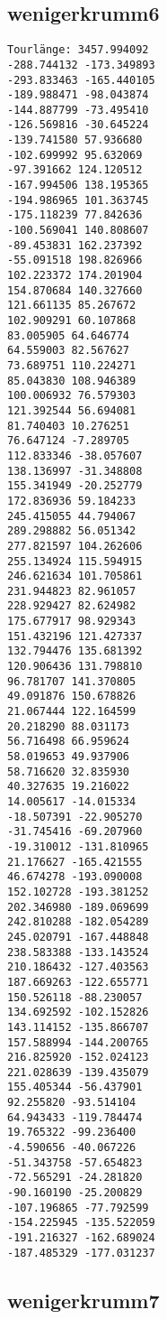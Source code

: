 \documentclass[a4paper, 10pt, ngerman]{article}
\begin{document}
\subsection*{wenigerkrumm6}

\begin{verbatim}
Tourlänge: 3457.994092
-288.744132 -173.349893
-293.833463 -165.440105
-189.988471 -98.043874
-144.887799 -73.495410
-126.569816 -30.645224
-139.741580 57.936680
-102.699992 95.632069
-97.391662 124.120512
-167.994506 138.195365
-194.986965 101.363745
-175.118239 77.842636
-100.569041 140.808607
-89.453831 162.237392
-55.091518 198.826966
102.223372 174.201904
154.870684 140.327660
121.661135 85.267672
102.909291 60.107868
83.005905 64.646774
64.559003 82.567627
73.689751 110.224271
85.043830 108.946389
100.006932 76.579303
121.392544 56.694081
81.740403 10.276251
76.647124 -7.289705
112.833346 -38.057607
138.136997 -31.348808
155.341949 -20.252779
172.836936 59.184233
245.415055 44.794067
289.298882 56.051342
277.821597 104.262606
255.134924 115.594915
246.621634 101.705861
231.944823 82.961057
228.929427 82.624982
175.677917 98.929343
151.432196 121.427337
132.794476 135.681392
120.906436 131.798810
96.781707 141.370805
49.091876 150.678826
21.067444 122.164599
20.218290 88.031173
56.716498 66.959624
58.019653 49.937906
58.716620 32.835930
40.327635 19.216022
14.005617 -14.015334
-18.507391 -22.905270
-31.745416 -69.207960
-19.310012 -131.810965
21.176627 -165.421555
46.674278 -193.090008
152.102728 -193.381252
202.346980 -189.069699
242.810288 -182.054289
245.020791 -167.448848
238.583388 -133.143524
210.186432 -127.403563
187.669263 -122.655771
150.526118 -88.230057
134.692592 -102.152826
143.114152 -135.866707
157.588994 -144.200765
216.825920 -152.024123
221.028639 -139.435079
155.405344 -56.437901
92.255820 -93.514104
64.943433 -119.784474
19.765322 -99.236400
-4.590656 -40.067226
-51.343758 -57.654823
-72.565291 -24.281820
-90.160190 -25.200829
-107.196865 -77.792599
-154.225945 -135.522059
-191.216327 -162.689024
-187.485329 -177.031237
\end{verbatim}

\subsection*{wenigerkrumm7}
\end{document}
